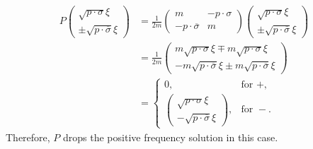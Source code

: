 \documentclass{article}
\begin{document}
\begin{align*}
    P \begin{pmatrix}
        \sqrt{p\cdot \sigma} \xi \\ \pm \sqrt{p\cdot \overline{\sigma}}\xi
    \end{pmatrix} &= \frac{1}{2m}\begin{pmatrix}
        m & -p\cdot\sigma \\
        -p\cdot \overline{\sigma} & m
    \end{pmatrix}\begin{pmatrix}
        \sqrt{p\cdot \sigma} \xi \\ \pm \sqrt{p\cdot \overline{\sigma}}\xi
    \end{pmatrix} \\
    &= \frac{1}{2m} \begin{pmatrix}
        m\sqrt{p\cdot \sigma} \xi \mp m \sqrt{p\cdot \sigma}\xi \\
        - m \sqrt{p\cdot \overline{\sigma}}\xi \pm m\sqrt{p\cdot \overline{\sigma}} \xi
    \end{pmatrix} \\
    &= \begin{cases}
        0, & \text{for } +, \\
        \begin{pmatrix}
            \sqrt{p\cdot \sigma} \xi \\ -\sqrt{p\cdot \overline{\sigma}}\xi
        \end{pmatrix}, & \text{for } -.
    \end{cases}
\end{align*}
Therefore, $P$ drops the positive frequency solution in this case.
\end{document}
